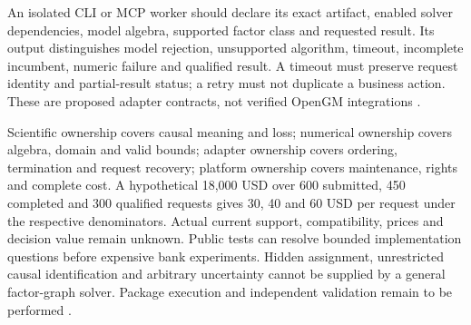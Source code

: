 An isolated CLI or MCP worker should declare its exact artifact, enabled
solver dependencies, model algebra, supported factor class and requested
result. Its output distinguishes model rejection, unsupported algorithm,
timeout, incomplete incumbent, numeric failure and qualified result. A
timeout must preserve request identity and partial-result status; a retry
must not duplicate a business action. These are proposed adapter contracts,
not verified OpenGM integrations \cite{exec24_opengm_choice}.

Scientific ownership covers causal meaning and loss; numerical ownership
covers algebra, domain and valid bounds; adapter ownership covers ordering,
termination and request recovery; platform ownership covers maintenance,
rights and complete cost. A hypothetical 18,000 USD over 600 submitted,
450 completed and 300 qualified requests gives 30, 40 and 60 USD per request
under the respective denominators. Actual current support, compatibility,
prices and decision value remain unknown. Public tests can resolve bounded
implementation questions before expensive bank experiments. Hidden
assignment, unrestricted causal identification and arbitrary uncertainty
cannot be supplied by a general factor-graph solver. Package execution and independent validation remain to be performed
\cite{exec24_opengm_choice}.
